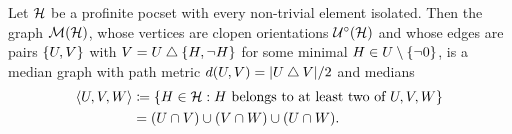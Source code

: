 \documentclass[reqno]{amsart}
\begin{document}
    \begin{proposition}\label{prp:construction_of_dual_median_graph}
        Let $\mathcal{H}$ be a profinite pocset with every non-trivial element isolated. Then the graph $\mathcal{M}(\mathcal{H})$, whose vertices are clopen orientations $\mathcal{U}^\circ(\mathcal{H})$ and whose edges are pairs $\left\{U,V\right\}$ with $V=U\bigtriangleup\left\{H,\lnot H\right\}$ for some minimal $H\in U\setminus\left\{\lnot0\right\}$, is a median graph with path metric $d(U,V)=|U\bigtriangleup V|/2$ and medians
        \begin{equation*}
            \begin{aligned}
                \left\langle U,V,W\right\rangle&\coloneqq\left\{H\in\mathcal{H}: H\textrm{ belongs to at least two of }U,V,W\right\} \\
                                        &=(U\cap V)\cup(V\cap W)\cup(U\cap W).
            \end{aligned}
        \end{equation*}
    \end{proposition}
\end{document}
